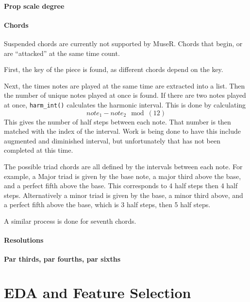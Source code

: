 \documentclass[12pt,twoside]{reedthesis}
\theoremstyle{definition}
\theoremstyle{definition}
\theoremstyle{definition}
\theoremstyle{remark}
\begin{document}
\subsubsection{Prop scale degree}\label{prop-scale-degree}

\subsubsection{Chords}\label{chords}

Suspended chords are currently not supported by MuseR. Chords that
begin, or are ``attacked'' at the same time count.

First, the key of the piece is found, as different chords depend on the
key.

Next, the times notes are played at the same time are extracted into a
list. Then the number of unique notes played at once is found. If there
are two notes played at once, \texttt{harm\_int()} calculates the
harmonic interval. This is done by calculating
\[note_1 - note_2 \mod(12)\] This gives the number of half steps between
each note. That number is then matched with the index of the interval.
Work is being done to have this include augmented and diminished
interval, but unfortunately that has not been completed at this time.

The possible triad chords are all defined by the intervals between each
note. For example, a Major triad is given by the base note, a major
third above the base, and a perfect fifth above the base. This
corresponds to 4 half steps then 4 half steps. Alternatively a minor
triad is given by the base, a minor third above, and a perfect fifth
above the base, which is 3 half steps, then 5 half steps.

A similar process is done for seventh chords.

\subsubsection{Resolutions}\label{resolutions}

\subsubsection{Par thirds, par fourths, par
sixths}\label{par-thirds-par-fourths-par-sixths}

\chapter{EDA and Feature Selection}\label{eda-and-feature-selection}
\end{document}

